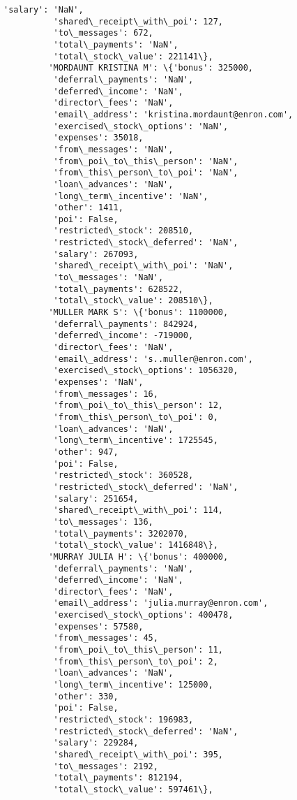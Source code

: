 \documentclass[11pt]{article}
\begin{document}
\begin{Verbatim}[commandchars=\\\{\}]
          'salary': 'NaN',
          'shared\_receipt\_with\_poi': 127,
          'to\_messages': 672,
          'total\_payments': 'NaN',
          'total\_stock\_value': 221141\},
         'MORDAUNT KRISTINA M': \{'bonus': 325000,
          'deferral\_payments': 'NaN',
          'deferred\_income': 'NaN',
          'director\_fees': 'NaN',
          'email\_address': 'kristina.mordaunt@enron.com',
          'exercised\_stock\_options': 'NaN',
          'expenses': 35018,
          'from\_messages': 'NaN',
          'from\_poi\_to\_this\_person': 'NaN',
          'from\_this\_person\_to\_poi': 'NaN',
          'loan\_advances': 'NaN',
          'long\_term\_incentive': 'NaN',
          'other': 1411,
          'poi': False,
          'restricted\_stock': 208510,
          'restricted\_stock\_deferred': 'NaN',
          'salary': 267093,
          'shared\_receipt\_with\_poi': 'NaN',
          'to\_messages': 'NaN',
          'total\_payments': 628522,
          'total\_stock\_value': 208510\},
         'MULLER MARK S': \{'bonus': 1100000,
          'deferral\_payments': 842924,
          'deferred\_income': -719000,
          'director\_fees': 'NaN',
          'email\_address': 's..muller@enron.com',
          'exercised\_stock\_options': 1056320,
          'expenses': 'NaN',
          'from\_messages': 16,
          'from\_poi\_to\_this\_person': 12,
          'from\_this\_person\_to\_poi': 0,
          'loan\_advances': 'NaN',
          'long\_term\_incentive': 1725545,
          'other': 947,
          'poi': False,
          'restricted\_stock': 360528,
          'restricted\_stock\_deferred': 'NaN',
          'salary': 251654,
          'shared\_receipt\_with\_poi': 114,
          'to\_messages': 136,
          'total\_payments': 3202070,
          'total\_stock\_value': 1416848\},
         'MURRAY JULIA H': \{'bonus': 400000,
          'deferral\_payments': 'NaN',
          'deferred\_income': 'NaN',
          'director\_fees': 'NaN',
          'email\_address': 'julia.murray@enron.com',
          'exercised\_stock\_options': 400478,
          'expenses': 57580,
          'from\_messages': 45,
          'from\_poi\_to\_this\_person': 11,
          'from\_this\_person\_to\_poi': 2,
          'loan\_advances': 'NaN',
          'long\_term\_incentive': 125000,
          'other': 330,
          'poi': False,
          'restricted\_stock': 196983,
          'restricted\_stock\_deferred': 'NaN',
          'salary': 229284,
          'shared\_receipt\_with\_poi': 395,
          'to\_messages': 2192,
          'total\_payments': 812194,
          'total\_stock\_value': 597461\},

\end{Verbatim}
\end{document}
